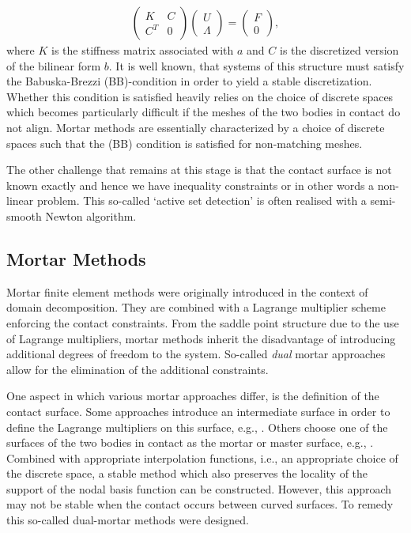 \documentclass[12pt]{article}
\begin{document}
\begin{align*}
  \begin{pmatrix}
    K &C\\
    C^T & 0
  \end{pmatrix}
  \begin{pmatrix}
    U\\
    \Lambda
  \end{pmatrix} =
  \begin{pmatrix}
    F\\
    0
  \end{pmatrix},
\end{align*}
where $K$ is the stiffness matrix associated with $a$ and $C$ is the discretized version of the bilinear form $b$.
It is well known, that systems of this structure must satisfy the Babuska-Brezzi (BB)-condition in order to yield a stable discretization. Whether this condition is satisfied heavily relies on the choice of discrete spaces which becomes particularly difficult if the meshes of the two bodies in contact do not align. Mortar methods are essentially characterized by a  choice of discrete spaces such that the (BB) condition is satisfied for non-matching meshes.

The other challenge that remains at this stage is that the contact surface is not known exactly and hence we have inequality constraints or in other words a non-linear problem. This so-called `active set detection' is often  realised with a semi-smooth Newton algorithm.
\subsection{Mortar Methods}
Mortar finite element methods were originally introduced in the context of domain decomposition.
They are combined with a  Lagrange multiplier scheme
enforcing the contact constraints. From the saddle point structure due to the use of Lagrange multipliers, mortar methods inherit the disadvantage of introducing additional degrees of freedom to the system. So-called \emph{dual} mortar approaches allow for the elimination of the additional constraints.

One aspect in which various mortar approaches differ, is the definition of the contact surface. Some
approaches introduce an intermediate surface in order to define the Lagrange multipliers on this surface, e.g., \cite{mcdevitt2000mortar}. Others choose one of the surfaces of the two bodies in contact as the mortar or master surface, e.g., \cite{wohlmuth2000mortar,krause2002dirichlet}. Combined with appropriate interpolation functions, i.e., an appropriate choice of the discrete space,  a stable method which also preserves the locality of the support of the nodal basis function can be constructed. However, this approach may not be stable when the contact occurs between curved surfaces. To remedy this so-called dual-mortar methods were designed.
\end{document}
